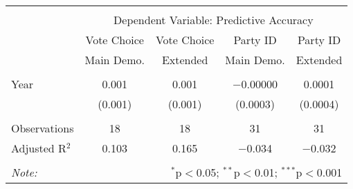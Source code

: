 
\begin{tabular}{@{\extracolsep{5pt}}lcccc} 
\\[-1.8ex]\midrule 
\midrule \\[-1.8ex] 
 & \multicolumn{4}{c}{Dependent Variable: Predictive Accuracy} \\ 
\cmidrule{2-5} 
 & Vote Choice & Vote Choice & Party ID & Party ID \\ & Main Demo. & Extended & Main Demo. & Extended \\ 
\midrule \\[-1.8ex] 
 Year & 0.001 & 0.001 & $-$0.00000 & 0.0001 \\ 
  & (0.001) & (0.001) & (0.0003) & (0.0004) \\ 
 \midrule \\[-1.8ex] 
Observations & 18 & 18 & 31 & 31 \\ 
Adjusted R$^{2}$ & 0.103 & 0.165 & $-$0.034 & $-$0.032 \\ 
\midrule 
\midrule \\[-1.8ex] 
\textit{Note:}  & \multicolumn{4}{r}{$^{*}$p$<$0.05; $^{**}$p$<$0.01; $^{***}$p$<$0.001} \\ 
\end{tabular} 
